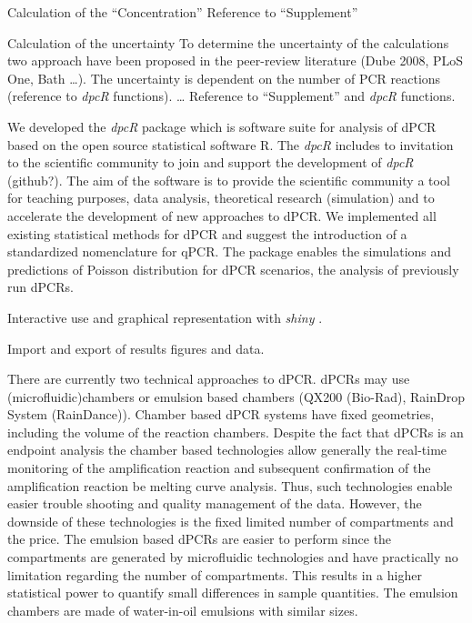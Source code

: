 \documentclass{bioinfo}
\begin{document}
Calculation of the ``Concentration''
Reference to ``Supplement''

Calculation of the uncertainty
To determine the uncertainty of the calculations two approach have been proposed 
in the peer-review literature (Dube 2008, PLoS One, Bath …). The uncertainty is 
dependent on the number of PCR reactions (reference to \textit{\textit{dpcR}} 
functions). … Reference to ``Supplement'' and \textit{dpcR} functions.

We developed the \textit{dpcR} package which is software suite for analysis of 
dPCR based on the open source statistical software R. The \textit{dpcR} includes 
to invitation to the scientific community to join and support the development of 
\textit{dpcR} (github?). The aim of the software is to provide the scientific 
community a tool for teaching purposes, data analysis, theoretical research 
(simulation) and to accelerate the development of new approaches to dPCR. We 
implemented all existing statistical methods for dPCR and suggest the 
introduction of a standardized nomenclature for qPCR. The package enables the 
simulations and predictions of Poisson distribution for dPCR scenarios, the 
analysis of previously run dPCRs.

Interactive use and graphical representation with \textit{shiny} \cite{shiny}.

Import and export of results figures and data.

There are currently two technical approaches to dPCR. dPCRs may use		%
(microfluidic)chambers or emulsion based chambers 
(QX200 \texttrademark (Bio-Rad), RainDrop \texttrademark System (RainDance)). 
Chamber based dPCR systems have fixed geometries, including the volume of the 
reaction chambers. Despite the fact that dPCRs is an endpoint analysis the 
chamber based technologies allow generally the real-time monitoring of the 
amplification reaction and subsequent confirmation of the amplification reaction 
be melting curve analysis. Thus, such technologies enable easier trouble 
shooting and quality management of the data. However, the downside of these 
technologies is the fixed limited number of compartments and the price. The 
emulsion based dPCRs are easier to perform since the compartments are generated 
by microfluidic technologies and have practically no limitation regarding the 
number of compartments. This results in a higher statistical power to quantify 
small differences in sample quantities. The emulsion chambers are made of 
water-in-oil emulsions with similar sizes.
\end{document}
